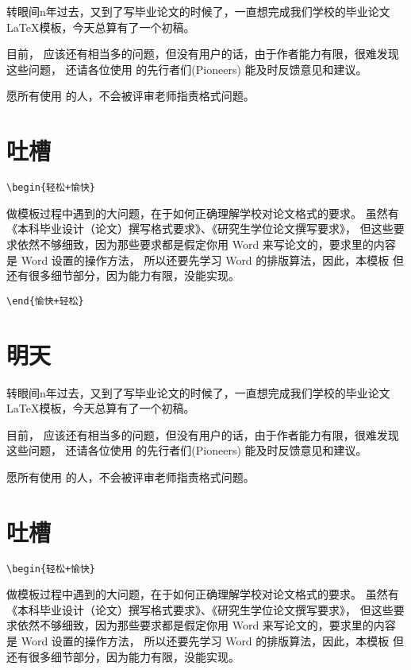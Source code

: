 转眼间n年过去，又到了写毕业论文的时候了，一直想完成我们学校的毕业论文\LaTeX{}模板，今天总算有了一个初稿。

目前， \nwafuthesis{} 应该还有相当多的问题，但没有用户的话，由于作者能力有限，很难发现这些问题，
还请各位使用 \nwafuthesis{} 的先行者们(Pioneers) 能及时反馈意见和建议。

愿所有使用 \nwafuthesis{} 的人，不会被评审老师指责格式问题。

\section{吐槽}

\verb!\begin{轻松+愉快}!

做模板过程中遇到的大问题，在于如何正确理解学校对论文格式的要求。
虽然有《本科毕业设计（论文）撰写格式要求》、《研究生学位论文撰写要求》，
但这些要求依然不够细致，因为那些要求都是假定你用 Word 来写论文的，要求里的内容是 Word 设置的操作方法，
所以还要先学习 Word 的排版算法，因此，本模板
但还有很多细节部分，因为能力有限，没能实现。

\verb!\end{愉快+轻松}!

\section{明天}

转眼间n年过去，又到了写毕业论文的时候了，一直想完成我们学校的毕业论文\LaTeX{}模板，今天总算有了一个初稿。

目前， \nwafuthesis{} 应该还有相当多的问题，但没有用户的话，由于作者能力有限，很难发现这些问题，
还请各位使用 \nwafuthesis{} 的先行者们(Pioneers) 能及时反馈意见和建议。

愿所有使用 \nwafuthesis{} 的人，不会被评审老师指责格式问题。

\section{吐槽}

\verb!\begin{轻松+愉快}!

做模板过程中遇到的大问题，在于如何正确理解学校对论文格式的要求。
虽然有《本科毕业设计（论文）撰写格式要求》、《研究生学位论文撰写要求》，
但这些要求依然不够细致，因为那些要求都是假定你用 Word 来写论文的，要求里的内容是 Word 设置的操作方法，
所以还要先学习 Word 的排版算法，因此，本模板
但还有很多细节部分，因为能力有限，没能实现。

